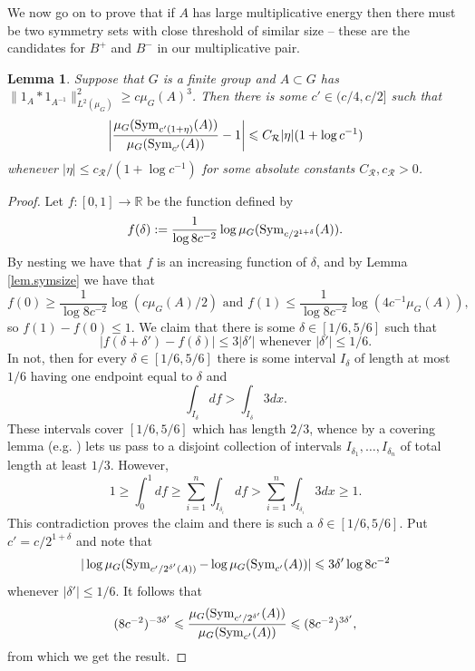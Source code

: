 \documentclass[12pt]{amsart}
\numberwithin{equation}{section}
\theoremstyle{plain}
\newtheorem{lemma}[subsection]{Lemma}
\theoremstyle{definition}
\renewcommand{\leq}{\leqslant}
\renewcommand{\geq}{\geqslant}
\providecommand{\Sym}{\mathop{\rm Sym}\nolimits}
\newcommand{\R}{\mathbb{R}}
\begin{document}
We now go on to prove that if $A$ has large multiplicative energy then there must be two symmetry sets with close threshold of similar size -- these are the candidates for $B^+$ and $B^-$ in our multiplicative pair.
\begin{lemma}\label{lem.ubr}
Suppose that $G$ is a finite group and $A \subset G$ has $\|1_A \ast 1_{A^{-1}}\|_{L^2(\mu_G)}^2 \geq c\mu_G(A)^3$. Then there is some $c' \in (c/4,c/2]$ such that
\begin{equation*}
\left|\frac{\mu_G(\Sym_{c'(1+\eta)}(A))}{\mu_G(\Sym_{c'}(A))} -1\right| \leq C_{\mathcal{R}}|\eta| (1+\log c^{-1})
\end{equation*}
whenever $|\eta| \leq c_{\mathcal{R}}/(1+\log c^{-1})$ for some absolute constants $C_{\mathcal{R}},c_{\mathcal{R}}>0$.
\end{lemma}
\begin{proof}
Let $f:[0,1]\rightarrow \R$ be the function defined by
\begin{equation*}
f(\delta):=\frac{1}{\log 8c^{-2}}\log \mu_G(\Sym_{c/2^{1+\delta}}(A)).
\end{equation*}
By nesting we have that $f$ is an increasing function of $\delta$, and by Lemma \ref{lem.symsize} we have that
\begin{equation*}
f(0) \geq \frac{1}{\log 8c^{-2}}\log (c\mu_G(A)/2) \textrm{ and } f(1) \leq \frac{1}{\log 8c^{-2}}\log (4c^{-1}\mu_G(A)),
\end{equation*}
so $f(1)-f(0)\leq 1$.  We claim that there is some $\delta \in [1/6,5/6]$ such that
\begin{equation*}
|f(\delta+\delta') - f(\delta)| \leq 3|\delta'| \textrm{ whenever } |\delta'| \leq 1/6.
\end{equation*}
In not, then for every $\delta \in [1/6,5/6]$ there is some interval $I_\delta$ of length at most $1/6$ having one endpoint equal to $\delta$ and
\begin{equation*}
\int_{I_\delta}{df} > \int_{I_\delta}{3dx}.
\end{equation*}
These intervals cover $[1/6,5/6]$ which has length $2/3$, whence by a covering lemma (e.g. \cite[Lemma 3.4]{BJGSVK}) lets us pass to a disjoint collection of intervals $I_{\delta_1},\dots,I_{\delta_n}$ of total length at least $1/3$.  However,
\begin{equation*}
1 \geq \int_0^1{df} \geq \sum_{i=1}^n{\int_{I_{\delta_i}}{df}} > \sum_{i=1}^n{\int_{I_{\delta_i}}{3dx}} \geq 1.
\end{equation*}
This contradiction proves the claim and there is such a $\delta \in [1/6,5/6]$.  Put $c'=c/2^{1+\delta}$ and note that
\begin{equation*}
|\log \mu_G(\Sym_{c'/2^{\delta'}(A))} - \log \mu_G(\Sym_{c'}(A))| \leq 3\delta'\log 8c^{-2}
\end{equation*}
whenever $|\delta'| \leq 1/6$.  It follows that
\begin{equation*}
(8c^{-2})^{-3\delta'}\leq \frac{\mu_G(\Sym_{c'/2^{\delta'}}(A))}{\mu_G(\Sym_{c'}(A)) } \leq (8c^{-2})^{3\delta'},
\end{equation*}
from which we get the result.
\end{proof}
\end{document}
